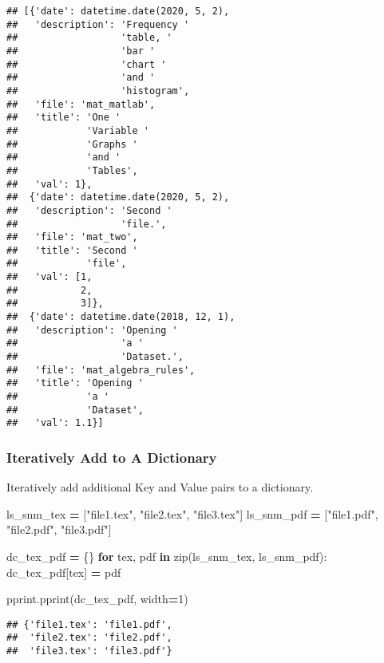 \documentclass[
]{book}
\newenvironment{Shaded}{\begin{snugshade}}{\end{snugshade}}
\newcommand{\BuiltInTok}[1]{#1}
\newcommand{\ControlFlowTok}[1]{\textcolor[rgb]{0.13,0.29,0.53}{\textbf{#1}}}
\newcommand{\DecValTok}[1]{\textcolor[rgb]{0.00,0.00,0.81}{#1}}
\newcommand{\KeywordTok}[1]{\textcolor[rgb]{0.13,0.29,0.53}{\textbf{#1}}}
\newcommand{\NormalTok}[1]{#1}
\newcommand{\OperatorTok}[1]{\textcolor[rgb]{0.81,0.36,0.00}{\textbf{#1}}}
\newcommand{\StringTok}[1]{\textcolor[rgb]{0.31,0.60,0.02}{#1}}
\begin{document}
\begin{verbatim}
## [{'date': datetime.date(2020, 5, 2),
##   'description': 'Frequency '
##                  'table, '
##                  'bar '
##                  'chart '
##                  'and '
##                  'histogram',
##   'file': 'mat_matlab',
##   'title': 'One '
##            'Variable '
##            'Graphs '
##            'and '
##            'Tables',
##   'val': 1},
##  {'date': datetime.date(2020, 5, 2),
##   'description': 'Second '
##                  'file.',
##   'file': 'mat_two',
##   'title': 'Second '
##            'file',
##   'val': [1,
##           2,
##           3]},
##  {'date': datetime.date(2018, 12, 1),
##   'description': 'Opening '
##                  'a '
##                  'Dataset.',
##   'file': 'mat_algebra_rules',
##   'title': 'Opening '
##            'a '
##            'Dataset',
##   'val': 1.1}]
\end{verbatim}

\hypertarget{iteratively-add-to-a-dictionary}{%
\subsubsection{Iteratively Add to A Dictionary}\label{iteratively-add-to-a-dictionary}}

Iteratively add additional Key and Value pairs to a dictionary.

\begin{Shaded}
\begin{Highlighting}[]

\NormalTok{ls_snm_tex }\OperatorTok{=}\NormalTok{ [}\StringTok{"file1.tex"}\NormalTok{, }\StringTok{"file2.tex"}\NormalTok{, }\StringTok{"file3.tex"}\NormalTok{]}
\NormalTok{ls_snm_pdf }\OperatorTok{=}\NormalTok{ [}\StringTok{"file1.pdf"}\NormalTok{, }\StringTok{"file2.pdf"}\NormalTok{, }\StringTok{"file3.pdf"}\NormalTok{]}

\NormalTok{dc_tex_pdf }\OperatorTok{=}\NormalTok{ \{\}}
\ControlFlowTok{for}\NormalTok{ tex, pdf }\KeywordTok{in} \BuiltInTok{zip}\NormalTok{(ls_snm_tex, ls_snm_pdf):}
\NormalTok{  dc_tex_pdf[tex] }\OperatorTok{=}\NormalTok{ pdf}

\NormalTok{pprint.pprint(dc_tex_pdf, width}\OperatorTok{=}\DecValTok{1}\NormalTok{)}
\end{Highlighting}
\end{Shaded}

\begin{verbatim}
## {'file1.tex': 'file1.pdf',
##  'file2.tex': 'file2.pdf',
##  'file3.tex': 'file3.pdf'}
\end{verbatim}
\end{document}

